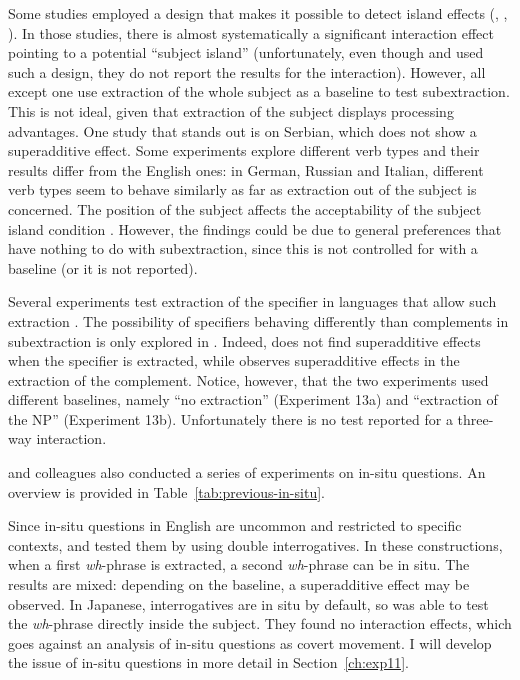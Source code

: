 Some studies employed a design that makes it possible to detect  island effects (\citealt[Experiment 13b]{Jurka.2010}, \citealt{Jurka.2011,Sprouse.2016} \citealt[Experiment 2]{Greco.2017}, \citealt{Kush.2018,Paneda.2020,Kobzeva.2022}). In those studies, there is almost systematically a significant interaction effect pointing to a potential ``subject island'' (unfortunately, even though \citet[Experiment 1 \& 2]{Jurka.2010} and \citet{Polinsky.2013} used such a design, they do not report the results for the interaction). However, all except one \citep{Greco.2017} use extraction of the whole subject as a baseline to test subextraction. This is not ideal, given that extraction of the subject displays processing advantages. One study that stands out is \citet[Experiment 13a]{Jurka.2010} on Serbian, which does not show a superadditive effect. Some experiments explore different verb types \citep{Jurka.2010,Polinsky.2013,Bianchi.2014} and their results differ from the English ones: in German, Russian and Italian, different verb types seem to behave similarly as far as extraction out of the subject is concerned. The position of the subject affects the acceptability of the subject island condition \citep{Jurka.2010,Jurka.2011,Polinsky.2013,Bianchi.2014}. However, the findings could be due to general preferences that have nothing to do with subextraction, since this is not controlled for with a baseline (or it is not reported).

Several experiments test extraction of the specifier  in languages that allow such extraction \citep{Jurka.2010,Jurka.2011,Polinsky.2013}. The possibility of specifiers behaving differently than complements in subextraction is only explored in \citet[Experiment 13a\&b]{Jurka.2010}. Indeed, \citet[Experiment 13a]{Jurka.2010} does not find superadditive effects when the specifier is extracted, while \citet[Experiment 13b]{Jurka.2010} observes superadditive effects in the extraction of the complement. Notice, however, that the two experiments used different baselines, namely ``no extraction'' (Experiment 13a) and ``extraction of the NP'' (Experiment 13b). Unfortunately there is no test reported for a three-way interaction.

\citeauthor{Sprouse.2007.PhD} and colleagues also conducted a series of experiments on in-situ questions. An overview is provided in Table~\ref{tab:previous-in-situ}.

Since in-situ questions in English are uncommon and restricted to specific contexts, \citet{Sprouse.2007.PhD} and \citet{Sprouse.2011} tested them by using double interrogatives. In these constructions, when a first \textit{wh}-phrase is extracted, a second \textit{wh}-phrase can be in situ. The results are mixed: depending on the baseline, a superadditive effect may be observed. In Japanese, interrogatives are in situ by default, so \citet{Sprouse.2011} was able to test  the \textit{wh}-phrase directly inside the subject. They found no interaction effects, which goes against an analysis of in-situ questions as covert movement. I will develop the issue of in-situ questions in more detail in Section~\ref{ch:exp11}.


